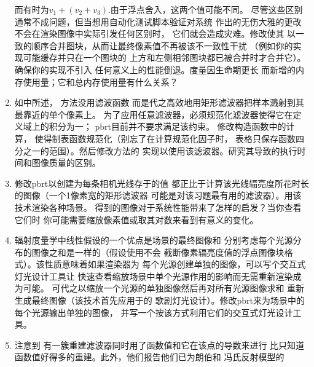\begin{enumerate}
            而有时为$v_1+(v_2+v_3)$.由于浮点舍入，这两个值可能不同。
            尽管这些区别通常不成问题，但当想用自动化测试脚本验证对系统
            作出的无伤大雅的更改不会在渲染图像中实际引发任何区别时，
            它们就会造成灾难。修改使其
            以一致的顺序合并图块，从而让最终像素值不再被该不一致性干扰
            （例如你的实现可能缓存并只在一个图块的
            上方和左侧相邻图块都已被合并时才合并它）。确保你的实现不引入
            任何意义上的性能倒退。度量因生命期更长
            而新增的内存使用量；它和总内存使用量有什么关系？
      \item \circletwo 如中所述，
            方法没用滤波函数
            而是代之高效地用矩形滤波器把样本溅射到其最靠近的单个像素上。
            为了应用任意滤波器，必须规范化滤波器使得它在定义域上的积分为一；
            pbrt目前并不要求满足该约束。
            修改构造函数中的计算，
            使得制表函数规范化（别忘了在计算规范化因子时，
            表格只保存函数四分之一的范围）。然后修改方法的
            实现以使用该滤波器。研究其导致的执行时间和图像质量的区别。
      \item \circleone 修改pbrt以创建为每条相机光线存于的值
            都正比于计算该光线辐亮度所花时长的图像（一个1像素宽的矩形滤波器
            可能是对该习题最有用的滤波器）。用该技术渲染各种场景。
            得到的图像对于系统性能带来了怎样的启发？当你查看它们时
            你可能需要缩放像素值或取其对数来看到有意义的变化。
      \item \circletwo 辐射度量学中线性假设的一个优点是场景的最终图像和
            分别考虑每个光源分布的图像之和是一样的（假设使用不会
            截断像素辐亮度值的浮点图像块格式）。该性质意味着如果渲染器为
            每个光源创建单独的图像，可以写个交互式灯光设计工具让
            快速查看缩放场景中单个光源作用的影响而无需重新渲染成为可能。
            可代之以缩放一个光源的单独图像然后再对所有光源图像求和
            重新生成最终图像（该技术首先应用于\citet{10.1145/122718.122723}的
            歌剧灯光设计）。修改pbrt来为场景中的每个光源输出单独的图像，
            并写一个按该方式利用它们的交互式灯光设计工具。
      \item \circlethree \citet{10.1145/54852.378514}注意到
            有一簇重建滤波器同时用了函数值和它在该点的导数来进行
            比只知道函数值好得多的重建。此外，他们报告他们已为朗伯和
            冯氏反射模型的

\end{enumerate}
